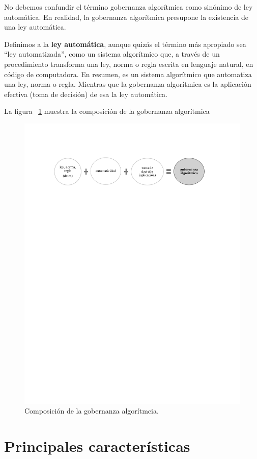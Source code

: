 \documentclass[12pt]{report} %
\begin{document}
No debemos confundir el término gobernanza algorítmica como sinónimo de ley automática. En realidad, la gobernanza algorítmica presupone la existencia de una ley automática. 

Definimos a la \textbf{ley automática}, aunque quizás el término más apropiado sea “ley automatizada”, como un sistema algorítmico que, a través de un procedimiento transforma una ley, norma o regla escrita en lenguaje natural, en código de computadora. En resumen, es un sistema algorítmico que automatiza una ley, norma o regla. Mientras que la gobernanza algorítmica es la aplicación efectiva (toma de decisión) de esa la ley automática.

La figura ~\ref{figdecirculos} muestra la composición de la gobernanza algorítmica

\begin{figure}
\centering
\includegraphics[width=0.85\columnwidth]{imagenes/figdecirculos.pdf}
\caption{Composición de la gobernanza algorítmcia.}
\label{figdecirculos}
\end{figure} 

\section{Principales características }
\end{document}

